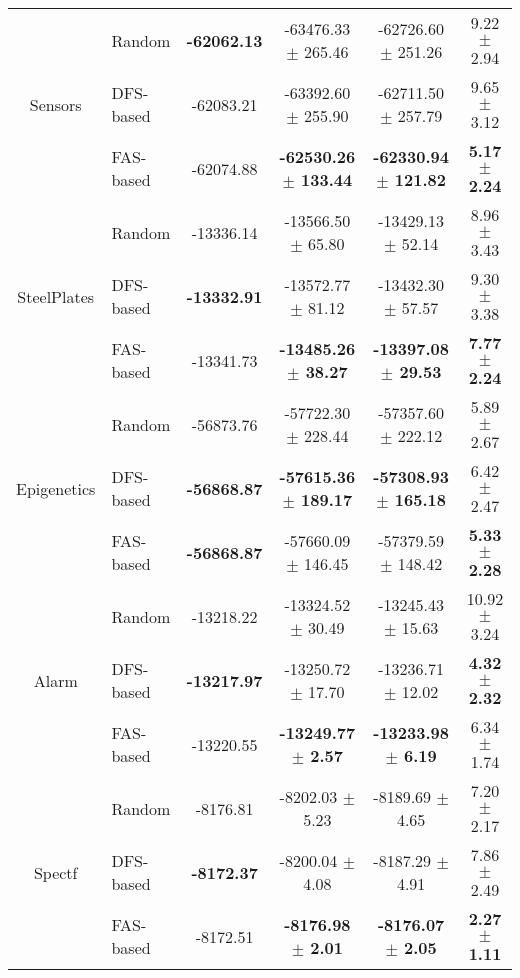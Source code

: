 \begin{table}[ h ]
\begin{tabular}{| c | l | c | c | c | c | }
			\multirow{3}{*}{Sensors} & Random & \textbf{-62062.13} & -63476.33 $\pm$ 265.46 & -62726.60 $\pm$ 251.26 & 9.22 $\pm$ 2.94 \\ \cline{2-6} 
					& DFS-based & -62083.21 & -63392.60 $\pm$ 255.90 & -62711.50 $\pm$ 257.79 & 9.65 $\pm$ 3.12 \\ \cline{2-6}
					& FAS-based & -62074.88 & \textbf{-62530.26 $\pm$ 133.44} & \textbf{-62330.94 $\pm$ 121.82} & \textbf{5.17 $\pm$ 2.24} \\ \hline

			\multirow{3}{*}{SteelPlates} & Random & -13336.14 & -13566.50 $\pm$ 65.80 & -13429.13 $\pm$ 52.14 & 8.96 $\pm$ 3.43 \\ \cline{2-6} 
					& DFS-based & \textbf{-13332.91} & -13572.77 $\pm$ 81.12 & -13432.30 $\pm$ 57.57 & 9.30 $\pm$ 3.38 \\ \cline{2-6}
					& FAS-based & -13341.73 & \textbf{-13485.26 $\pm$ 38.27} & \textbf{-13397.08 $\pm$ 29.53} & \textbf{7.77 $\pm$ 2.24} \\ \hline

			\multirow{3}{*}{Epigenetics} & Random & -56873.76 & -57722.30 $\pm$ 228.44 & -57357.60 $\pm$ 222.12 & 5.89 $\pm$ 2.67 \\ \cline{2-6} 
					& DFS-based & \textbf{-56868.87} & \textbf{-57615.36 $\pm$ 189.17} & \textbf{-57308.93 $\pm$ 165.18} & 6.42 $\pm$ 2.47 \\ \cline{2-6}
					& FAS-based & \textbf{-56868.87} & -57660.09 $\pm$ 146.45 & -57379.59 $\pm$ 148.42 & \textbf{5.33 $\pm$ 2.28} \\ \hline

			\multirow{3}{*}{Alarm} & Random & -13218.22 & -13324.52 $\pm$ 30.49 & -13245.43 $\pm$ 15.63 & 10.92 $\pm$ 3.24 \\ \cline{2-6} 
					& DFS-based & \textbf{-13217.97} & -13250.72 $\pm$ 17.70 & -13236.71 $\pm$ 12.02 & \textbf{4.32 $\pm$ 2.32} \\ \cline{2-6}
					& FAS-based & -13220.55 & \textbf{-13249.77 $\pm$ 2.57} & \textbf{-13233.98 $\pm$ 6.19} & 6.34 $\pm$ 1.74 \\ \hline

			\multirow{3}{*}{Spectf} & Random & -8176.81 & -8202.03 $\pm$ 5.23 & -8189.69 $\pm$ 4.65 & 7.20 $\pm$ 2.17 \\ \cline{2-6} 
					& DFS-based & \textbf{-8172.37} & -8200.04 $\pm$ 4.08 & -8187.29 $\pm$ 4.91 & 7.86 $\pm$ 2.49 \\ \cline{2-6}
					& FAS-based & -8172.51 & \textbf{-8176.98 $\pm$ 2.01} & \textbf{-8176.07 $\pm$ 2.05} & \textbf{2.27 $\pm$ 1.11} \\ \hline
					

\end{tabular}
\end{table}
